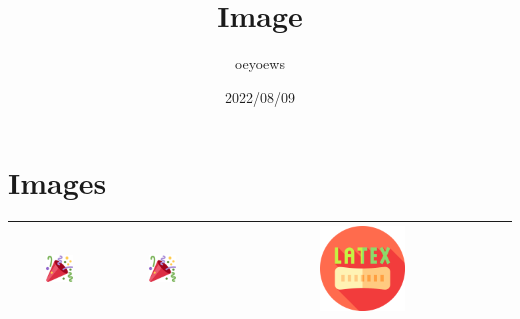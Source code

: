 \documentclass{article}
\title{Image \emoji{book}}
\author{oeyoews}
\date{2022/08/09}
\begin{document}
\maketitle

\section{ Images}
\label{sec:img}

\begin{table}
\begin{tabular}{|c|c|c|}\hline
	\includegraphics[width=0.3\textwidth]{tw-tada} & \includegraphics[width=0.3\textwidth]{tw-tada} & \includegraphics[width=0.3\textwidth]{latex} \\\hline
\end{tabular}
\end{table}
\end{document}
